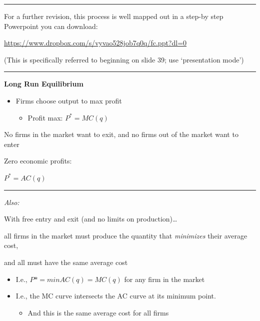 \documentclass[]{article}
\providecommand{\tightlist}{%
  \setlength{\itemsep}{0pt}\setlength{\parskip}{0pt}}
\begin{document}
\begin{center}\rule{0.5\linewidth}{\linethickness}\end{center}

For a further revision, this process is well mapped out in a step-by
step Powerpoint you can download:

\url{https://www.dropbox.com/s/vyvao528job7q0q/fc.ppt?dl=0}

(This is specifically referred to beginning on slide 39; use
`presentation mode')

\begin{center}\rule{0.5\linewidth}{\linethickness}\end{center}

\textbf{Long Run Equilibrium}

\begin{itemize}
\tightlist
\item
  Firms choose output to max profit

  \begin{itemize}
  \tightlist
  \item
    Profit max: \(P^* = MC(q)\)
  \end{itemize}
\end{itemize}

No firms in the market want to exit, and no firms out of the market want
to enter

Zero economic profits:

\(P^* = AC(q)\)

\begin{center}\rule{0.5\linewidth}{\linethickness}\end{center}

\emph{Also:}

With free entry and exit (and no limits on production)\ldots{}

all firms in the market must produce the quantity that \emph{minimizes}
their average cost,

and all must have the same average cost

\begin{itemize}
\tightlist
\item
  I.e., \(P* = min AC(q) = MC(q)\) for any firm in the market
\item
  I.e., the MC curve intersects the AC curve at its minimum point.

  \begin{itemize}
  \tightlist
  \item
    And this is the same average cost for all firms
  \end{itemize}
\end{itemize}
\end{document}
